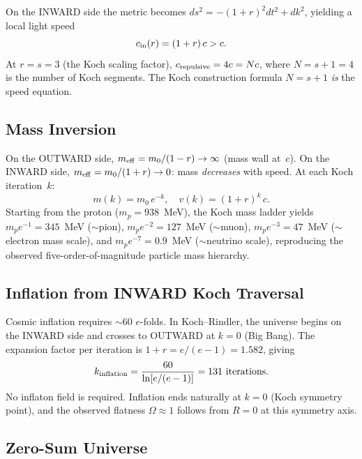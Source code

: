 \documentclass[twocolumn,showpacs,preprintnumbers,amsmath,amssymb,prl]{revtex4-2}
\begin{document}
On the INWARD side the metric becomes $ds^2 = -(1+r)^2 dt^2 + dk^2$,
yielding a local light speed
\begin{equation}
    c_{\rm in}(r) = (1+r)\,c > c.
    \label{eq:metalight}
\end{equation}
At $r = s = 3$ (the Koch scaling factor),
$c_{\rm repulsive} = 4c = Nc$, where $N = s + 1 = 4$ is the number
of Koch segments. The Koch construction formula $N = s + 1$
\emph{is} the speed equation.

\subsection{Mass Inversion}

On the OUTWARD side, $m_{\rm eff} = m_0/(1-r) \to \infty$ (mass wall
at~$c$). On the INWARD side, $m_{\rm eff} = m_0/(1+r) \to 0$:
mass \emph{decreases} with speed. At each Koch iteration~$k$:
\begin{equation}
    m(k) = m_0\,e^{-k}, \quad v(k) = (1+r)^k\,c.
    \label{eq:massinversion}
\end{equation}
Starting from the proton ($m_p = 938$~MeV), the Koch mass ladder
yields $m_p e^{-1} = 345$~MeV ($\sim$pion),
$m_p e^{-2} = 127$~MeV ($\sim$muon),
$m_p e^{-3} = 47$~MeV ($\sim$electron mass scale),
and $m_p e^{-7} = 0.9$~MeV ($\sim$neutrino scale),
reproducing the observed five-order-of-magnitude particle mass hierarchy.

\subsection{Inflation from INWARD Koch Traversal}

Cosmic inflation requires $\sim$60 $e$-folds. In Koch--Rindler, the
universe begins on the INWARD side and crosses to OUTWARD at $k = 0$
(Big Bang). The expansion factor per iteration is
$1 + r = e/(e-1) = 1.582$, giving
\begin{equation}
    k_{\rm inflation} = \frac{60}{\ln[e/(e-1)]} = 131~\text{iterations}.
    \label{eq:inflation}
\end{equation}
No inflaton field is required. Inflation ends naturally at $k = 0$
(Koch symmetry point), and the observed flatness $\Omega \approx 1$
follows from $R = 0$ at this symmetry axis.

\subsection{Zero-Sum Universe}
\end{document}

